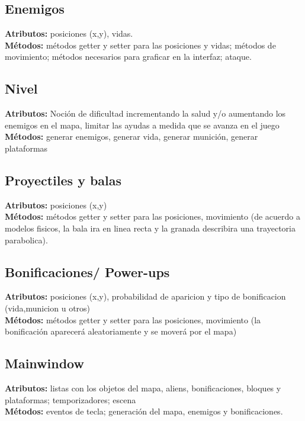 \documentclass{article}
\begin{document}
\subsection{Enemigos}
\noindent\textbf{Atributos:} posiciones (x,y), vidas.\\
\textbf{Métodos:} métodos getter y setter para las posiciones y vidas; métodos de movimiento; métodos necesarios para graficar en la interfaz; ataque.

\subsection{Nivel}
\noindent\textbf{Atributos:} Noción de dificultad incrementando la salud y/o aumentando los enemigos en el mapa, limitar las ayudas a medida que se avanza en el juego\\
\textbf{Métodos:} generar enemigos, generar vida, generar munición, generar plataformas

\subsection{Proyectiles y balas}
\noindent\textbf{Atributos:} posiciones (x,y)\\
\textbf{Métodos:} métodos getter y setter para las posiciones, movimiento (de acuerdo a modelos fisicos, la bala ira en linea recta y la granada describira una trayectoria parabolica).

\subsection{Bonificaciones/ Power-ups}
\noindent\textbf{Atributos:} posiciones (x,y), probabilidad de aparicion y tipo de bonificacion (vida,municion u otros)\\
\textbf{Métodos:} métodos getter y setter para las posiciones, movimiento (la bonificación aparecerá aleatoriamente y se moverá por el mapa)

\subsection{Mainwindow}
\noindent\textbf{Atributos:} listas con los objetos del mapa, aliens, bonificaciones, bloques y plataformas; temporizadores; escena\\
\textbf{Métodos:} eventos de tecla; generación del mapa, enemigos y bonificaciones.
\end{document}
